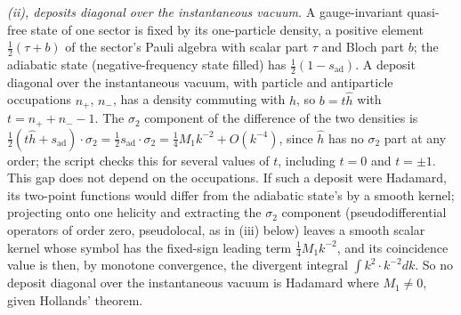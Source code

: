 \emph{(ii), deposits diagonal over the instantaneous vacuum.} A gauge-invariant quasi-free state of one sector is fixed by its one-particle density, a positive element $\tfrac12(\tau + b)$ of the sector's Pauli algebra with scalar part $\tau$ and Bloch part $b$; the adiabatic state (negative-frequency state filled) has $\tfrac12(1 - s_{\mathrm{ad}})$. A deposit diagonal over the instantaneous vacuum, with particle and antiparticle occupations $n_{+}$, $n_{-}$, has a density commuting with $h$, so $b = t\hat h$ with $t = n_{+} + n_{-} - 1$. The $\sigma_{2}$ component of the difference of the two densities is $\tfrac12(t\hat h + s_{\mathrm{ad}})\cdot\sigma_{2} = \tfrac12 s_{\mathrm{ad}}\cdot\sigma_{2} = \tfrac14M_{1}k^{-2} + O(k^{-4})$, since $\hat h$ has no $\sigma_{2}$ part at any order; the script checks this for several values of $t$, including $t = 0$ and $t = \pm1$. This gap does not depend on the occupations. If such a deposit were Hadamard, its two-point functions would differ from the adiabatic state's by a smooth kernel; projecting onto one helicity and extracting the $\sigma_{2}$ component (pseudodifferential operators of order zero, pseudolocal, as in (iii) below) leaves a smooth scalar kernel whose symbol has the fixed-sign leading term $\tfrac14M_{1}k^{-2}$, and its coincidence value is then, by monotone convergence, the divergent integral $\int k^{2}\cdot k^{-2}dk$. So no deposit diagonal over the instantaneous vacuum is Hadamard where $M_{1} \neq 0$, given Hollands' theorem.

